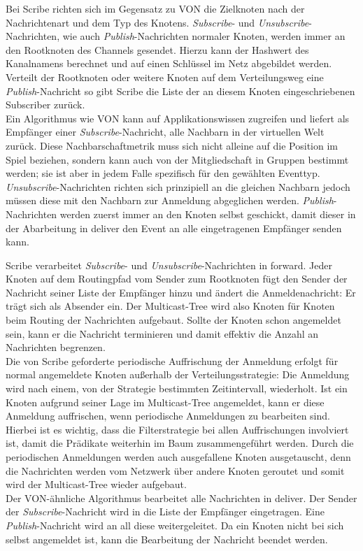 Bei Scribe richten sich im Gegensatz zu VON die Zielknoten nach der Nachrichtenart und dem Typ des Knotens. \emph{Subscribe}- und \emph{Unsubscribe}-Nachrichten, wie auch \emph{Publish}-Nachrichten normaler Knoten, werden immer an den Rootknoten des Channels gesendet. Hierzu kann der Hashwert des Kanalnamens berechnet und auf einen Schlüssel im Netz abgebildet werden. Verteilt der Rootknoten oder weitere Knoten auf dem Verteilungsweg eine \emph{Publish}-Nachricht so gibt Scribe die Liste der an diesem Knoten eingeschriebenen Subscriber zurück.\\
Ein Algorithmus wie VON kann auf Applikationswissen zugreifen und liefert als Empfänger einer \emph{Subscribe}-Nachricht, alle Nachbarn in der virtuellen Welt zurück. Diese Nachbarschaftmetrik muss sich nicht alleine auf die Position im Spiel beziehen, sondern kann auch von der Mitgliedschaft in Gruppen bestimmt werden; sie ist aber in jedem Falle spezifisch für den gewählten Eventtyp. \emph{Unsubscribe}-Nachrichten richten sich prinzipiell an die gleichen Nachbarn jedoch müssen diese mit den Nachbarn zur Anmeldung abgeglichen werden. \emph{Publish}-Nachrichten werden zuerst immer an den Knoten selbst geschickt, damit dieser in der Abarbeitung in deliver den Event an alle eingetragenen Empfänger senden kann.

Scribe verarbeitet \emph{Subscribe}- und \emph{Unsubscribe}-Nachrichten in forward. Jeder Knoten auf dem Routingpfad vom Sender zum Rootknoten fügt den Sender der Nachricht seiner Liste der Empfänger hinzu und ändert die Anmeldenachricht: Er trägt sich als Absender ein. Der Multicast-Tree wird also Knoten für Knoten beim Routing der Nachrichten aufgebaut. Sollte der Knoten schon angemeldet sein, kann er die Nachricht terminieren und damit effektiv die Anzahl an Nachrichten begrenzen.\\
Die von Scribe geforderte periodische Auffrischung der Anmeldung erfolgt für normal angemeldete Knoten außerhalb der Verteilungsstrategie: Die Anmeldung wird nach einem, von der Strategie bestimmten Zeitintervall, wiederholt. Ist ein Knoten aufgrund seiner Lage im Multicast-Tree angemeldet, kann er diese Anmeldung auffrischen, wenn periodische Anmeldungen zu bearbeiten sind. Hierbei ist es wichtig, dass die Filterstrategie bei allen Auffrischungen involviert ist, damit die Prädikate weiterhin im Baum zusammengeführt werden. Durch die periodischen Anmeldungen werden auch ausgefallene Knoten ausgetauscht, denn die Nachrichten werden vom Netzwerk über andere Knoten geroutet und somit wird der Multicast-Tree wieder aufgebaut.\\
Der VON-ähnliche Algorithmus bearbeitet alle Nachrichten in deliver. Der Sender der \emph{Subscribe}-Nachricht wird in die Liste der Empfänger eingetragen. Eine \emph{Publish}-Nachricht wird an all diese weitergeleitet. Da ein Knoten nicht bei sich selbst angemeldet ist, kann die Bearbeitung der Nachricht beendet werden.

